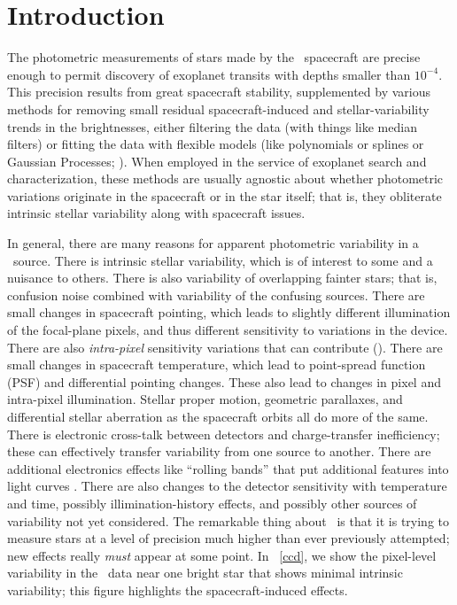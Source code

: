 \section{Introduction}

The photometric measurements of stars made by the \Kepler\ spacecraft are precise enough
  to permit discovery of exoplanet transits with depths smaller than $10^{-4}$.
This precision results from great spacecraft stability,
  supplemented by various methods for removing small residual spacecraft-induced and stellar-variability trends in the brightnesses,
  either filtering the data (with things like median filters)
  or fitting the data with flexible models (like polynomials or splines or Gaussian Processes; 
  \citealt{gaussian}).
When employed in the service of exoplanet search and characterization,
  these methods are usually agnostic about whether photometric variations originate in the spacecraft or in the star itself;
  that is, they obliterate intrinsic stellar variability along with spacecraft issues.

In general, there are many reasons for apparent photometric variability in a \Kepler\ source.
There is intrinsic stellar variability,
  which is of interest to some and a nuisance to others.
There is also variability of overlapping fainter stars;
  that is, confusion noise combined with variability of the confusing sources.
There are small changes in spacecraft pointing,
  which leads to slightly different illumination of the focal-plane pixels,
  and thus different sensitivity to variations in the device.
There are also \emph{intra-pixel} sensitivity variations that can contribute (\citealt{subpixel}).
There are small changes in spacecraft temperature,
  which lead to point-spread function (PSF) and differential pointing changes.
These also lead to changes in pixel and intra-pixel illumination.
Stellar proper motion, geometric parallaxes, and differential stellar aberration as the spacecraft orbits all do more of the same.
There is electronic cross-talk between detectors and charge-transfer inefficiency;
  these can effectively transfer variability from one source to another.
There are additional electronics effects like ``rolling bands'' that put additional features into light curves \citep{handbook}.
There are also changes to the detector sensitivity with temperature and time,
  possibly illimination-history effects,
  and possibly other sources of variability not yet considered.
The remarkable thing about \Kepler\ is that it is trying to measure stars at a level of precision
  much higher than ever previously attempted;
  new effects really \emph{must} appear at some point.
In \figurename~\ref{ccd}, we show the pixel-level variability in the \Kepler\ data
  near one bright star that shows minimal intrinsic variability;
  this figure highlights the spacecraft-induced effects.

